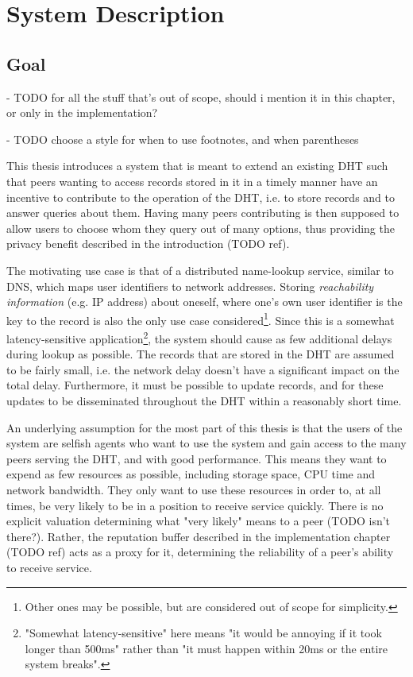 \chapter{System Description}
\section{Goal}
- TODO for all the stuff that's out of scope, should i mention it in this
  chapter, or only in the implementation?

- TODO choose a style for when to use footnotes, and when parentheses

This thesis introduces a system that is meant to extend an existing \ac{DHT}
such that peers wanting to access records stored in it in a timely manner have
an incentive to contribute to the operation of the \ac{DHT}, i.e. to store
records and to answer queries about them. Having many peers contributing is then
supposed to allow users to choose whom they query out of many options, thus
providing the privacy benefit described in the introduction (TODO ref).

The motivating use case is that of a distributed name-lookup service, similar to
DNS, which maps user identifiers to network addresses. Storing
\emph{reachability information} (e.g. IP address) about oneself, where one's own
user identifier is the key to the record is also the only use case
considered\footnote{Other ones may be possible, but are considered out of scope
for simplicity.}. Since this is a somewhat latency-sensitive
application\footnote{"Somewhat latency-sensitive" here means "it would be
annoying if it took longer than 500ms" rather than "it must happen within 20ms
or the entire system breaks".}, the system should cause as few additional delays
during lookup as possible. The records that are stored in the \ac{DHT} are
assumed to be fairly small, i.e. the network delay doesn't have a significant
impact on the total delay. Furthermore, it must be possible to update records,
and for these updates to be disseminated throughout the \ac{DHT} within a
reasonably short time.

An underlying assumption for the most part of this thesis is that the users of
the system are selfish agents who want to use the system and gain access to the
many peers serving the \ac{DHT}, and with good performance. This means they want
to expend as few resources as possible, including storage space, CPU time and
network bandwidth. They only want to use these resources in order to, at all
times, be very likely to be in a position to receive service quickly. There is
no explicit valuation determining what "very likely" means to a peer (TODO isn't
there?). Rather, the reputation buffer described in the implementation chapter
(TODO ref) acts as a proxy for it, determining the reliability of a peer's
ability to receive service.

